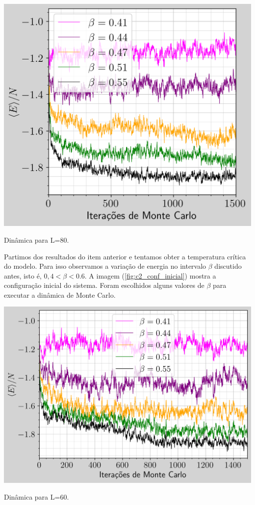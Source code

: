 \begin{marginfigure}
    \centering
    \includegraphics[width=\linewidth]{graficos/tarefa-3/graf-tarefa-C2-L80.png}
    \caption{Dinâmica para L=80.}
    \label{fig:c2_l80}
\end{marginfigure}

Partimos dos resultados do item anterior e tentamos obter a temperatura crítica do modelo. Para isso observamos
a variação de energia no intervalo $\beta$ discutido antes, isto é, $0,4 < \beta < 0.6$. 
A imagem (\ref{fig:c2_conf_inicial}) mostra a configuração inicial do sistema. Foram escolhidos alguns 
valores de $\beta$ para executar a dinâmica de Monte Carlo. 


\begin{marginfigure}
    \centering
    \includegraphics[width=\linewidth]{graficos/tarefa-3/graf-tarefa-C2-L60.png}
    \caption{Dinâmica para L=60.}
    \label{fig:c2_l60}
\end{marginfigure}



